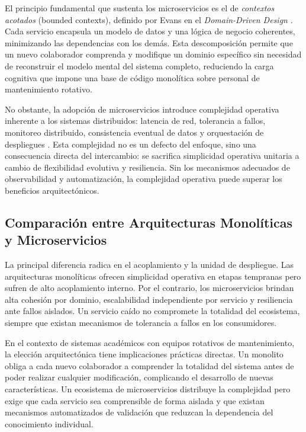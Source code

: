 El principio fundamental que sustenta los microservicios es el de \textit{contextos acotados} (bounded contexts), definido por Evans en el \textit{Domain-Driven Design} \cite{evans2003ddd}. Cada servicio encapsula un modelo de datos y una l\'{o}gica de negocio coherentes, minimizando las dependencias con los dem\'{a}s. Esta descomposici\'{o}n permite que un nuevo colaborador comprenda y modifique un dominio espec\'{i}fico sin necesidad de reconstruir el modelo mental del sistema completo, reduciendo la carga cognitiva que impone una base de c\'{o}digo monol\'{i}tica sobre personal de mantenimiento rotativo.

No obstante, la adopci\'{o}n de microservicios introduce complejidad operativa inherente a los sistemas distribuidos: latencia de red, tolerancia a fallos, monitoreo distribuido, consistencia eventual de datos y orquestaci\'{o}n de despliegues \cite{richardson2018microservices}. Esta complejidad no es un defecto del enfoque, sino una consecuencia directa del intercambio: se sacrifica simplicidad operativa unitaria a cambio de flexibilidad evolutiva y resiliencia. Sin los mecanismos adecuados de observabilidad y automatizaci\'{o}n, la complejidad operativa puede superar los beneficios arquitect\'{o}nicos.

\subsection{Comparaci\'{o}n entre Arquitecturas Monol\'{i}ticas y Microservicios}

La principal diferencia radica en el acoplamiento y la unidad de despliegue. Las arquitecturas monol\'{i}ticas ofrecen simplicidad operativa en etapas tempranas pero sufren de alto acoplamiento interno. Por el contrario, los microservicios brindan alta cohesi\'{o}n por dominio, escalabilidad independiente por servicio y resiliencia ante fallos aislados. Un servicio ca\'{i}do no compromete la totalidad del ecosistema, siempre que existan mecanismos de tolerancia a fallos en los consumidores.

En el contexto de sistemas acad\'{e}micos con equipos rotativos de mantenimiento, la elecci\'{o}n arquitect\'{o}nica tiene implicaciones pr\'{a}cticas directas. Un monolito obliga a cada nuevo colaborador a comprender la totalidad del sistema antes de poder realizar cualquier modificaci\'{o}n, complicando el desarrollo de nuevas caracter\'{i}sticas. Un ecosistema de microservicios distribuye la complejidad pero exige que cada servicio sea comprensible de forma aislada y que existan mecanismos automatizados de validaci\'{o}n que reduzcan la dependencia del conocimiento individual.

